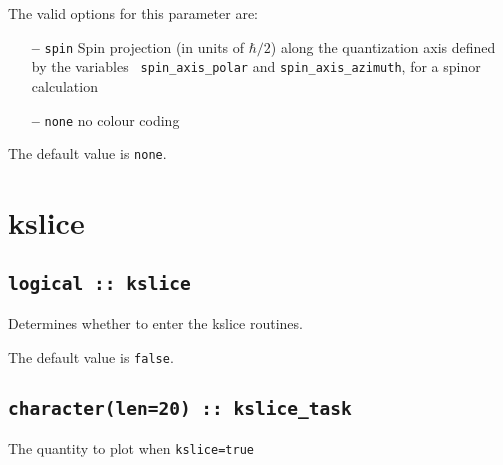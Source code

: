 The valid options for this parameter are:
\begin{itemize}
\item[{\bf --}] \verb#spin# Spin projection (in units of $\hbar/2$)
  along the quantization axis defined by the variables {\tt
    spin\_axis\_polar} and {\tt spin\_axis\_azimuth}, for a spinor
  calculation
\item[{\bf --}]  \verb#none# no colour coding
\end{itemize}

The default value is {\tt none}.


\clearpage
\section{kslice}

\subsection[berry]{\tt logical :: kslice}
Determines whether to enter the kslice routines.

The default value is \verb#false#.

\subsection[kslice\_task]{\tt character(len=20) ::  kslice\_task}
The quantity to plot when {\tt kslice=true} 

